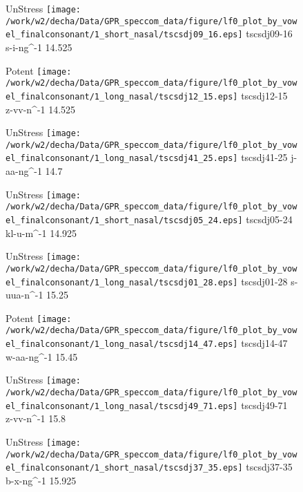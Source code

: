 \documentclass{article}
\begin{document}
\begin{figure}[t]
\begin{minipage}[b]{.24\textwidth}
UnStress
\centering
\texttt{[image: /work/w2/decha/Data/GPR\_speccom\_data/figure/lf0\_plot\_by\_vowel\_finalconsonant/1\_short\_nasal/tscsdj09\_16.eps]}
tscsdj09-16 s-i-ng\textasciicircum-1 14.525
\end{minipage}
\begin{minipage}[b]{.24\textwidth}
\colorbox{Apricot}{Potent}
\centering
\texttt{[image: /work/w2/decha/Data/GPR\_speccom\_data/figure/lf0\_plot\_by\_vowel\_finalconsonant/1\_long\_nasal/tscsdj12\_15.eps]}
tscsdj12-15 z-vv-n\textasciicircum-1 14.525
\end{minipage}
\begin{minipage}[b]{.24\textwidth}
UnStress
\centering
\texttt{[image: /work/w2/decha/Data/GPR\_speccom\_data/figure/lf0\_plot\_by\_vowel\_finalconsonant/1\_long\_nasal/tscsdj41\_25.eps]}
tscsdj41-25 j-aa-ng\textasciicircum-1 14.7
\end{minipage}
\begin{minipage}[b]{.24\textwidth}
UnStress
\centering
\texttt{[image: /work/w2/decha/Data/GPR\_speccom\_data/figure/lf0\_plot\_by\_vowel\_finalconsonant/1\_short\_nasal/tscsdj05\_24.eps]}
tscsdj05-24 kl-u-m\textasciicircum-1 14.925
\end{minipage}
\end{figure}
\clearpage
\begin{figure}[t]
\begin{minipage}[b]{.24\textwidth}
UnStress
\centering
\texttt{[image: /work/w2/decha/Data/GPR\_speccom\_data/figure/lf0\_plot\_by\_vowel\_finalconsonant/1\_long\_nasal/tscsdj01\_28.eps]}
tscsdj01-28 s-uua-n\textasciicircum-1 15.25
\end{minipage}
\begin{minipage}[b]{.24\textwidth}
\colorbox{Apricot}{Potent}
\centering
\texttt{[image: /work/w2/decha/Data/GPR\_speccom\_data/figure/lf0\_plot\_by\_vowel\_finalconsonant/1\_long\_nasal/tscsdj14\_47.eps]}
tscsdj14-47 w-aa-ng\textasciicircum-1 15.45
\end{minipage}
\begin{minipage}[b]{.24\textwidth}
UnStress
\centering
\texttt{[image: /work/w2/decha/Data/GPR\_speccom\_data/figure/lf0\_plot\_by\_vowel\_finalconsonant/1\_long\_nasal/tscsdj49\_71.eps]}
tscsdj49-71 z-vv-n\textasciicircum-1 15.8
\end{minipage}
\begin{minipage}[b]{.24\textwidth}
UnStress
\centering
\texttt{[image: /work/w2/decha/Data/GPR\_speccom\_data/figure/lf0\_plot\_by\_vowel\_finalconsonant/1\_short\_nasal/tscsdj37\_35.eps]}
tscsdj37-35 b-x-ng\textasciicircum-1 15.925
\end{minipage}
\end{figure}
\end{document}
